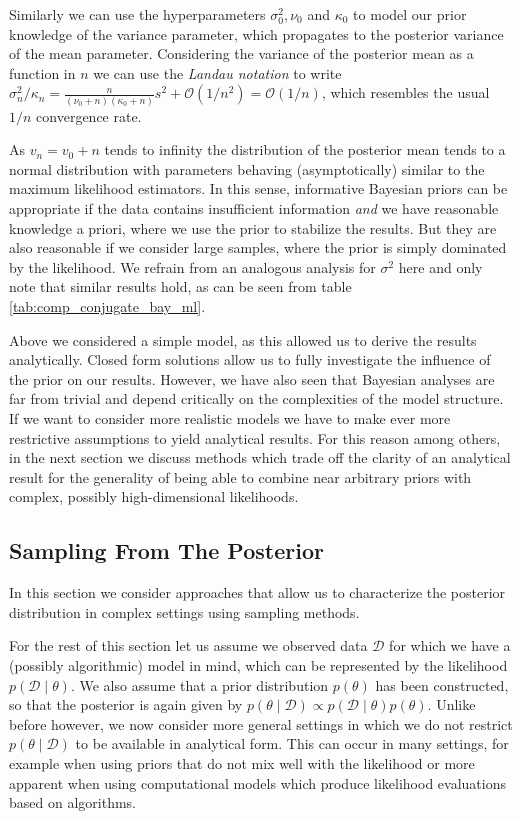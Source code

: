 Similarly we can use the hyperparameters $\sigma_0^2, \nu_0$ and $\kappa_0$ to model our prior knowledge of the variance parameter, which propagates to the posterior variance of the mean parameter.
Considering the variance of the posterior mean as a function in $n$ we can use the \emph{Landau notation} to write $\sigma_n^2 / \kappa_n =  \frac{n}{(\nu_0 + n)(\kappa_0 + n)} s^2 + \mathcal{O}(1/n^2) = \mathcal{O}(1/n)$, which resembles the usual $1/n$ convergence rate.

As $v_n = v_0 + n$ tends to infinity the distribution of the posterior mean tends to a normal distribution with parameters behaving (asymptotically) similar to the maximum likelihood estimators.
In this sense, informative Bayesian priors can be appropriate if the data contains insufficient information \emph{and} we have reasonable knowledge a priori, where we use the prior to stabilize the results.
But they are also reasonable if we consider large samples, where the prior is simply dominated by the likelihood.
We refrain from an analogous analysis for $\sigma^2$ here and only note that similar results hold, as can be seen from table \ref{tab:comp_conjugate_bay_ml}.

Above we considered a simple model, as this allowed us to derive the results analytically.
Closed form solutions allow us to fully investigate the influence of the prior on our results.
However, we have also seen that Bayesian analyses are far from trivial and depend critically on the complexities of the model structure.
If we want to consider more realistic models we have to make ever more restrictive assumptions to yield analytical results.
For this reason among others, in the next section we discuss methods which trade off the clarity of an analytical result for the generality of being able to combine near arbitrary priors with complex, possibly high-dimensional likelihoods.

\subsection{Sampling From The Posterior}
In this section we consider approaches that allow us to characterize the posterior distribution in complex settings using sampling methods.

For the rest of this section let us assume we observed data $\mathcal{D}$ for which we have a (possibly algorithmic) model in mind, which can be represented by the likelihood $p(\mathcal{D} \mid \theta)$.
We also assume that a prior distribution $p(\theta)$ has been constructed, so that the posterior is again given by $p(\theta \mid \mathcal{D}) \propto p(\mathcal{D} \mid \theta) p(\theta)$.
Unlike before however, we now consider more general settings in which we do not restrict $p(\theta \mid \mathcal{D})$ to be available in analytical form.
This can occur in many settings, for example when using priors that do not mix well with the likelihood or more apparent when using computational models which produce likelihood evaluations based on algorithms.

